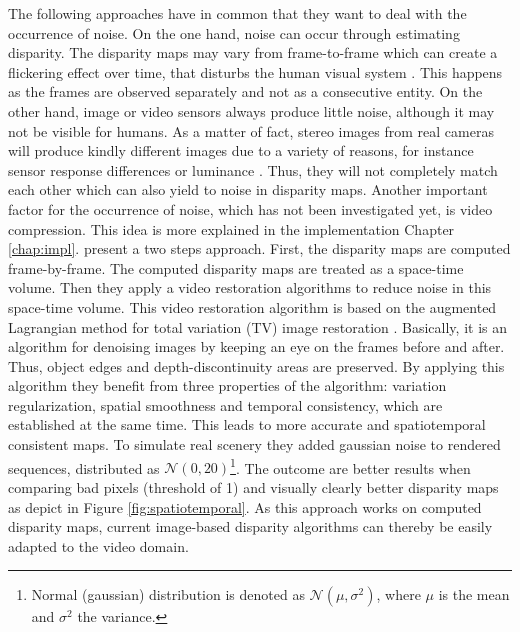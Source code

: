 The following approaches have in common that they want to deal with the occurrence of noise.
On the one hand, noise can occur through estimating disparity.
The disparity maps may vary from frame-to-frame which can create a flickering effect over time, that disturbs the human visual system \citep{khoshabeh2011spatio}.
This happens as the frames are observed separately and not as a consecutive entity.
On the other hand, image or video sensors always produce little noise, although it may not be visible for humans.
As a matter of fact, stereo images from real cameras will produce kindly different images due to a variety of reasons, for instance sensor response differences or luminance \citep{khoshabeh2011spatio, cyganek2011introduction}.
Thus, they will not completely match each other which can also yield to noise in disparity maps.
Another important factor for the occurrence of noise, which has not been investigated yet, is video compression.
This idea is more explained in the implementation Chapter \ref{chap:impl}.
\newline\newline\noindent \citeauthor{khoshabeh2011spatio} \citep{khoshabeh2011spatio} present a two steps approach.
First, the disparity maps are computed frame-by-frame.
The computed disparity maps are treated as a space-time volume.
Then they apply a video restoration algorithms to reduce noise in this space-time volume.
This video restoration algorithm is based on the augmented Lagrangian method for total variation (TV) image restoration \citep{chan2011augmented}.
Basically, it is an algorithm for denoising images by keeping an eye on the frames before and after.
Thus, object edges and depth-discontinuity areas are preserved.
By applying this algorithm they benefit from three properties of the algorithm: variation regularization, spatial smoothness and temporal consistency, which are established at the same time.
This leads to more accurate and spatiotemporal consistent maps.
To simulate real scenery they added gaussian noise to rendered sequences, distributed as $\mathcal{N}(0,20)$\footnote{Normal (gaussian) distribution is denoted as $\mathcal{N}(\mu,\sigma^2)$, where $\mu$ is the mean and $\sigma^2$ the variance.}.
The outcome are better results when comparing bad pixels (threshold of 1) and visually clearly better disparity maps as depict in Figure \ref{fig:spatiotemporal}.
As this approach works on computed disparity maps, current image-based disparity algorithms can thereby be easily adapted to the video domain.

